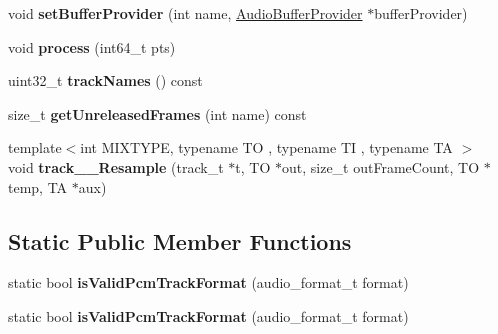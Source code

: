 \begin{DoxyCompactItemize}
void {\bfseries set\+Buffer\+Provider} (int name, \hyperlink{classcocos2d_1_1experimental_1_1AudioBufferProvider}{Audio\+Buffer\+Provider} $\ast$buffer\+Provider)
\item 
\mbox{\label{classcocos2d_1_1experimental_1_1AudioMixer_a812f0c0816c9ba236d694ab52f48e592}} 
void {\bfseries process} (int64\+\_\+t pts)
\item 
\mbox{\label{classcocos2d_1_1experimental_1_1AudioMixer_af43b486f4c8cc4356e95df6363471295}} 
uint32\+\_\+t {\bfseries track\+Names} () const
\item 
\mbox{\label{classcocos2d_1_1experimental_1_1AudioMixer_ab24d91b2c4bab5e658e4746840c159d1}} 
size\+\_\+t {\bfseries get\+Unreleased\+Frames} (int name) const
\item 
\mbox{\label{classcocos2d_1_1experimental_1_1AudioMixer_a60157295d28f97f8532822b4dc8979bb}} 
{\footnotesize template$<$int M\+I\+X\+T\+Y\+PE, typename TO , typename TI , typename TA $>$ }\\void {\bfseries track\+\_\+\+\_\+\+Resample} (track\+\_\+t $\ast$t, TO $\ast$out, size\+\_\+t out\+Frame\+Count, TO $\ast$temp, TA $\ast$aux)
\end{DoxyCompactItemize}
\subsection*{Static Public Member Functions}
\begin{DoxyCompactItemize}
\item 
\mbox{\label{classcocos2d_1_1experimental_1_1AudioMixer_aae75f7930665c12399cbef2524d2a95f}} 
static bool {\bfseries is\+Valid\+Pcm\+Track\+Format} (audio\+\_\+format\+\_\+t format)
\item 
\mbox{\label{classcocos2d_1_1experimental_1_1AudioMixer_aae75f7930665c12399cbef2524d2a95f}} 
static bool {\bfseries is\+Valid\+Pcm\+Track\+Format} (audio\+\_\+format\+\_\+t format)
\end{DoxyCompactItemize}
